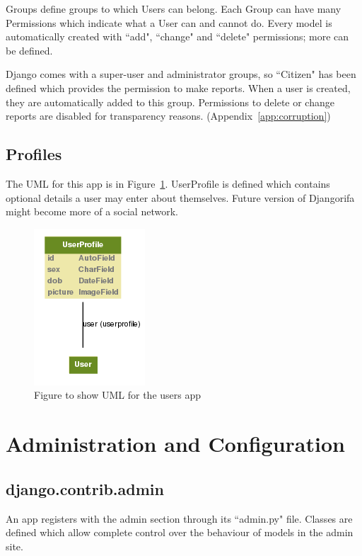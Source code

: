 Groups define groups to which Users can belong. Each Group can have many Permissions which indicate what a User can and cannot do. Every model is automatically created with ``add", ``change" and ``delete" permissions; more can be defined.

Django comes with a super-user and  administrator groups, so ``Citizen" has been defined which provides the permission to make reports. When a user is created, they are automatically added to this group. Permissions to delete or change reports are disabled for transparency reasons. (Appendix~\ref{app:corruption})

\subsection{Profiles}
\label{sec:profiles}

The UML for this app is in Figure~\ref{fig:users}. UserProfile is defined which contains optional details a user may enter about themselves. Future version of Djangorifa might become more of a social network.

\begin{figure}[h]
\centering
\includegraphics[scale=0.7]{img/users.png}
\caption{Figure to show UML for the users app}
\label{fig:users}
\end{figure}

\section{Administration and Configuration}
\label{sec:di:admin}

\subsection{django.contrib.admin}
An app registers with the admin section through its ``admin.py" file. Classes are defined which allow complete control over the behaviour of models in the admin site.

